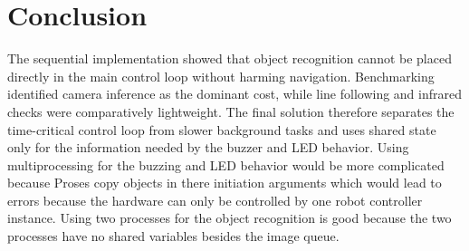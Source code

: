 \documentclass{article}
\begin{document}
\section{Conclusion }

The sequential implementation showed that object recognition cannot be placed directly in the main control loop without harming navigation. Benchmarking identified camera inference as the dominant cost, while line following and infrared checks were comparatively lightweight. The final solution therefore separates the time-critical control loop from slower background tasks and uses shared state only for the information needed by the buzzer and LED behavior. Using multiprocessing for the buzzing and LED behavior would be more complicated because Proses copy objects in there initiation arguments which would lead to errors because the hardware can only be controlled by one robot controller instance. Using two processes for the object recognition is good because the two processes have no shared variables besides the image queue.
\end{document}
